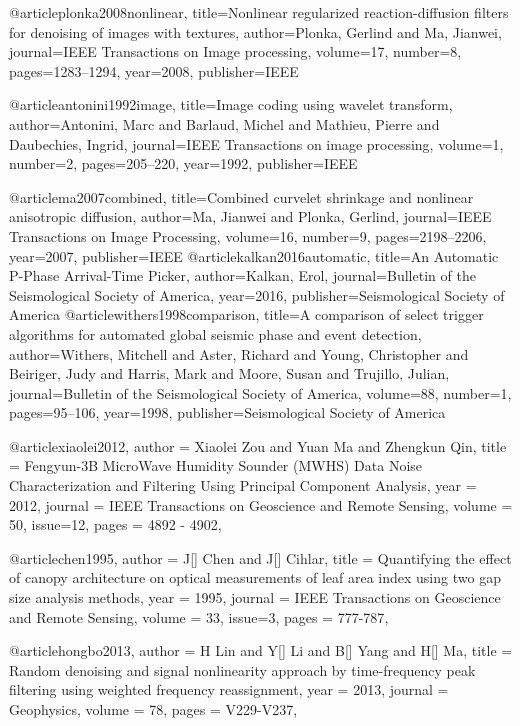 @article{plonka2008nonlinear,
  title={Nonlinear regularized reaction-diffusion filters for denoising of images with textures},
  author={Plonka, Gerlind and Ma, Jianwei},
  journal={IEEE Transactions on Image processing},
  volume={17},
  number={8},
  pages={1283--1294},
  year={2008},
  publisher={IEEE}
}

@article{antonini1992image,
  title={Image coding using wavelet transform},
  author={Antonini, Marc and Barlaud, Michel and Mathieu, Pierre and Daubechies, Ingrid},
  journal={IEEE Transactions on image processing},
  volume={1},
  number={2},
  pages={205--220},
  year={1992},
  publisher={IEEE}
}

@article{ma2007combined,
  title={Combined curvelet shrinkage and nonlinear anisotropic diffusion},
  author={Ma, Jianwei and Plonka, Gerlind},
  journal={IEEE Transactions on Image Processing},
  volume={16},
  number={9},
  pages={2198--2206},
  year={2007},
  publisher={IEEE}
}
@article{kalkan2016automatic,
  title={An Automatic P-Phase Arrival-Time Picker},
  author={Kalkan, Erol},
  journal={Bulletin of the Seismological Society of America},
  year={2016},
  publisher={Seismological Society of America}
}
@article{withers1998comparison,
  title={A comparison of select trigger algorithms for automated global seismic phase and event detection},
  author={Withers, Mitchell and Aster, Richard and Young, Christopher and Beiriger, Judy and Harris, Mark and Moore, Susan and Trujillo, Julian},
  journal={Bulletin of the Seismological Society of America},
  volume={88},
  number={1},
  pages={95--106},
  year={1998},
  publisher={Seismological Society of America}
}



@article{xiaolei2012,
  author =	 {Xiaolei Zou and Yuan Ma and Zhengkun Qin},
  title =	 {Fengyun-3B MicroWave Humidity Sounder (MWHS) Data Noise Characterization and Filtering Using Principal Component Analysis},
  year =	 2012,
  journal =	 {IEEE Transactions on Geoscience and Remote Sensing},
  volume =	 50,
  issue=12,
  pages =	 {4892 - 4902},
}

@article{chen1995,
  author =	 {J[] Chen and J[] Cihlar},
  title =	 {Quantifying the effect of canopy architecture on optical measurements of leaf area index using two gap size analysis methods},
  year =	 1995,
  journal =	 {IEEE Transactions on Geoscience and Remote Sensing},
  volume =	 33,
  issue=3,
  pages =	 {777-787},
}


@article{hongbo2013,
  author =	 {H Lin and Y[] Li and B[] Yang and H[] Ma},
  title =	 {Random denoising and signal nonlinearity approach by time-frequency peak filtering using weighted frequency reassignment},
  year =	 2013,
  journal =	 {Geophysics},
  volume =	 78,
  pages =	 {V229-V237},
}

